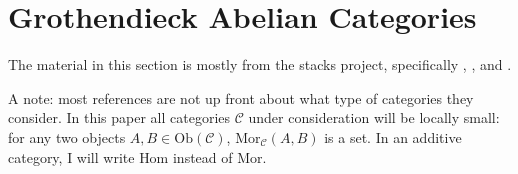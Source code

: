\begin{comment}
\documentclass[letterpaper,11pt]{article}
\usepackage{amsfonts,amssymb,amsmath,amsthm,latexsym}
\usepackage{stmaryrd}
\usepackage[all]{xy}
\usepackage{fullpage}
\usepackage{hyperref}

\newtheorem{thm}{Theorem}
\newtheorem{lem}{Lemma}
\newtheorem{cor}{Corollary}
\newtheorem{prop}{Proposition}

\theoremstyle{definition}
\newtheorem{defn}{Definition}

\theoremstyle{remark}
\newtheorem{ex}{Example}
\newtheorem{rem}{Remark}
\newtheorem{exer}{Exercise}



\newcommand{\CC}{\mathbb{C}}
\newcommand{\RR}{\mathbb{R}}

\title{Notes on Sheaf Cohomology}
\date{}
\maketitle

\tableofcontents
\end{comment}

\section{Grothendieck Abelian Categories}

The material in this section is mostly from the stacks project, specifically \cite[\href{http://stacks.math.columbia.edu/tag/05NM}{Tag 05NM}]{stacks-project}, \cite[\href{http://stacks.math.columbia.edu/tag/079A}{Tag 079A}]{stacks-project}, and \cite[\href{http://stacks.math.columbia.edu/tag/05AB}{Tag 05AB}]{stacks-project}.

A note: most references are not up front about what type of categories they consider. In this paper all categories $\mathcal{C}$ under consideration will be locally small: for any two objects $A,B\in \mbox{Ob}(\mathcal{C})$, $\mbox{Mor}_\mathcal{C}(A,B)$ is a set. In an additive category, I will write $\mbox{Hom}$ instead of $\mbox{Mor}$.

